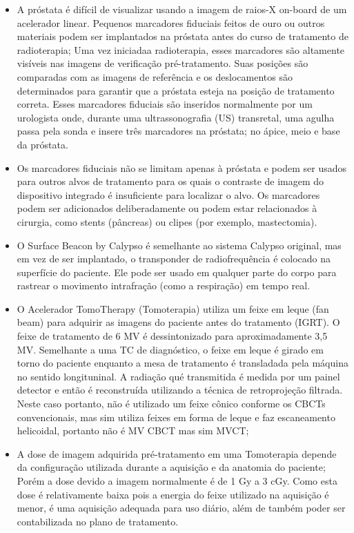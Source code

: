 \documentclass[11pt,a4paper]{article}
\newcounter{exemplo}
\begin{document}
\begin{exemplo}[12. IGRT ]
\begin{itemize}
        \item A próstata é difícil de visualizar usando a imagem de raios-X on-board de um acelerador linear. Pequenos marcadores fiduciais feitos de ouro ou outros materiais podem ser implantados na próstata antes do curso de tratamento de radioterapia; Uma vez iniciadaa radioterapia, esses marcadores são altamente visíveis nas imagens de verificação pré-tratamento. Suas posições são comparadas com as imagens de referência e os deslocamentos são determinados para garantir que a próstata esteja na posição de tratamento correta. Esses marcadores fiduciais são inseridos normalmente por um urologista onde, durante uma ultrassonografia (US) transretal, uma agulha passa pela sonda e insere três marcadores na próstata; no ápice, meio e base da próstata.
        
        \item Os marcadores fiduciais não se limitam apenas à próstata e podem ser usados para outros alvos de tratamento para os quais o contraste de imagem do dispositivo integrado é insuficiente para localizar o alvo. Os marcadores podem ser adicionados deliberadamente ou podem estar relacionados à cirurgia, como stents (pâncreas) ou clipes (por exemplo, mastectomia).
        
        \item O Surface Beacon by Calypso é semelhante ao sistema Calypso original, mas em vez de ser implantado, o transponder de radiofrequência é colocado na superfície do paciente. Ele pode ser usado em qualquer parte do corpo para rastrear o movimento intrafração (como a respiração) em tempo real.
        
        \item O Acelerador TomoTherapy (Tomoterapia) utiliza um feixe em leque (fan beam) para adquirir as imagens do paciente antes do tratamento (IGRT). O feixe de tratamento de 6 MV é dessintonizado para aproximadamente 3,5 MV. Semelhante a uma TC de diagnóstico, o feixe em leque é girado em torno do paciente enquanto a mesa de tratamento é transladada pela máquina no sentido longituninal. A radiação qué transmitida é medida por um painel detector e então é reconstruída utilizando a técnica de retroprojeção filtrada. Neste caso portanto, não é utilizado um feixe cônico conforme os CBCTs convencionais, mas sim utiliza feixes em forma de leque e faz escaneamento helicoidal, portanto não é MV CBCT mas sim MVCT;
        
        \item A dose de imagem adquirida pré-tratamento em uma Tomoterapia depende da configuração utilizada durante a aquisição e da anatomia do paciente; Porém a dose devido a imagem normalmente é de 1 Gy a 3 cGy. Como esta dose é relativamente baixa pois a energia do feixe utilizado na aquisição é menor, é uma aquisição adequada para uso diário, além de também poder ser contabilizada no plano de tratamento.
        

\end{itemize}
\end{exemplo}
\end{document}
